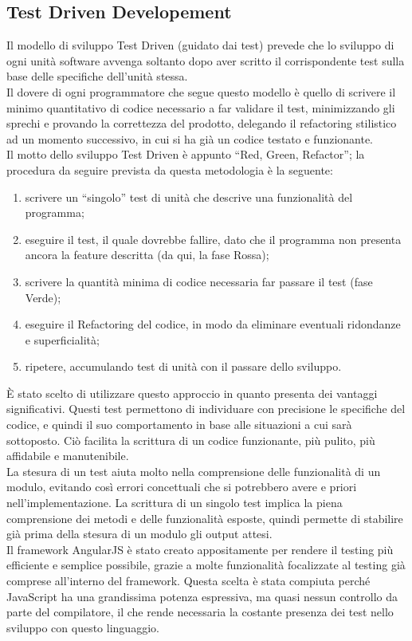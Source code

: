 \subsection{Test Driven Developement}
Il modello di sviluppo Test Driven (guidato dai test) prevede che lo sviluppo di ogni unità software avvenga soltanto dopo aver scritto il corrispondente test sulla base delle specifiche dell’unità stessa.\\
Il dovere di ogni programmatore che segue questo modello è quello di scrivere il minimo quantitativo di codice necessario a far validare il test, minimizzando gli sprechi e provando la correttezza del prodotto, delegando il refactoring stilistico ad un momento successivo, in cui si ha già un codice testato e funzionante.\\
Il motto dello sviluppo Test Driven è appunto “Red, Green, Refactor”; la procedura da seguire prevista da questa metodologia è la seguente:
\begin{enumerate}
	\item scrivere un “singolo” test di unità che descrive una funzionalità del programma;
	\item eseguire il test, il quale dovrebbe fallire, dato che il programma non presenta ancora la feature descritta (da qui, la fase Rossa);
	\item scrivere la quantità minima di codice necessaria far passare il test (fase Verde);
	\item eseguire il Refactoring del codice, in modo da eliminare eventuali ridondanze e superficialità;
	\item ripetere, accumulando test di unità con il passare dello sviluppo.
\end{enumerate}
 \`{E} stato scelto di utilizzare questo approccio in quanto presenta dei vantaggi significativi. Questi test permettono di individuare con precisione le specifiche del codice, e quindi il suo comportamento in base alle situazioni a cui sarà sottoposto. Ciò facilita la scrittura di un codice funzionante, più pulito, più affidabile e manutenibile.\\
La stesura di un test aiuta molto nella comprensione delle funzionalità di un modulo, evitando così errori concettuali che si potrebbero avere e priori nell'implementazione. La scrittura di un singolo test implica la piena comprensione dei metodi e delle funzionalità esposte, quindi permette di stabilire già prima della stesura di un modulo gli output attesi.\\
Il framework AngularJS è stato creato appositamente per rendere il testing più efficiente e semplice possibile, grazie a molte funzionalità focalizzate al testing già comprese all’interno del framework. Questa scelta è stata compiuta perché JavaScript ha una grandissima potenza espressiva, ma quasi nessun controllo da parte del compilatore, il che rende necessaria la costante presenza dei test nello sviluppo con questo linguaggio.

